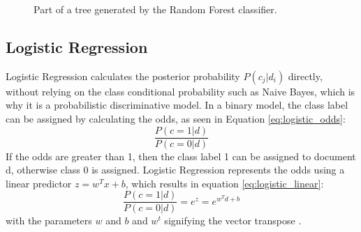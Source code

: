         \begin{figure}[h!]
        \centering
    \caption{Part of a tree generated by the Random Forest classifier.}
      \label{fig:tree}
\end{figure}
\subsection{Logistic Regression}
Logistic Regression calculates the posterior probability $P(c_j|d_i)$ directly, without relying on the class conditional probability such as Naive Bayes, which is why it is a probabilistic discriminative model. In a binary model, the class label can be assigned by calculating the odds, as seen in Equation \eqref{eq:logistic_odds}:
        \begin{equation}
            \label{eq:logistic_odds}
                \frac{P(c=1|d)}{P(c=0|d)}
        \end{equation}
If the odds are greater than 1, then the class label 1 can be assigned to document d, otherwise class 0 is assigned. Logistic Regression represents the odds using a linear predictor $z=w^Tx + b$, which results in equation \eqref{eq:logistic_linear}:
        \begin{equation}
            \label{eq:logistic_linear}
                \frac{P(c=1|d)}{P(c=0|d)} = e^z = e^{w^Td+b}
        \end{equation}
with the parameters $w$ and $b$ and $w^t$ signifying the vector transpose \cite{DBLP:books/aw/TanSKK2019}.


